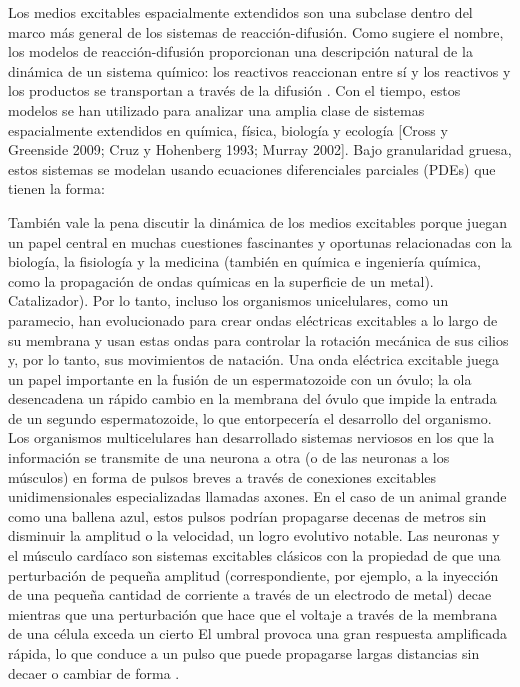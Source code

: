 Los medios excitables espacialmente extendidos son una subclase dentro del marco más general de los sistemas de reacción-difusión. Como sugiere el nombre, los modelos de reacción-difusión proporcionan una descripción natural de la dinámica de un sistema químico: los reactivos reaccionan entre sí y los reactivos y los productos se transportan a través de la difusión \cite{sinha_patterns_2019}. Con el tiempo, estos modelos se han utilizado para analizar una amplia clase de sistemas espacialmente extendidos en química, física, biología y ecología [Cross y Greenside 2009; Cruz y Hohenberg 1993; Murray 2002]. Bajo granularidad gruesa, estos sistemas se modelan usando ecuaciones diferenciales parciales (PDEs) que tienen la forma:


También vale la pena discutir la dinámica de los medios excitables porque juegan un papel central en muchas cuestiones fascinantes y oportunas relacionadas con la biología, la fisiología y la medicina (también en química e ingeniería química, como la propagación de ondas químicas en la superficie de un metal). Catalizador). Por lo tanto, incluso los organismos unicelulares, como un paramecio, han evolucionado para crear ondas eléctricas excitables a lo largo de su membrana y usan estas ondas para controlar la rotación mecánica de sus cilios y, por lo tanto, sus movimientos de natación. Una onda eléctrica excitable juega un papel importante en la fusión de un espermatozoide con un óvulo; la ola desencadena un rápido cambio en la membrana del óvulo que impide la entrada de un segundo espermatozoide, lo que entorpecería el desarrollo del organismo. Los organismos multicelulares han desarrollado sistemas nerviosos en los que la información se transmite de una neurona a otra (o de las neuronas a los músculos) en forma de pulsos breves a través de conexiones excitables unidimensionales especializadas llamadas axones. En el caso de un animal grande como una ballena azul, estos pulsos podrían propagarse decenas de metros sin disminuir la amplitud o la velocidad, un logro evolutivo notable.
Las neuronas y el músculo cardíaco son sistemas excitables clásicos con la propiedad de que una perturbación de pequeña amplitud (correspondiente, por ejemplo, a la inyección de una pequeña cantidad de corriente a través de un electrodo de metal) decae mientras que una perturbación que hace que el voltaje a través de la membrana de una célula exceda un cierto El umbral provoca una gran respuesta amplificada rápida, lo que conduce a un pulso que puede propagarse largas distancias sin decaer o cambiar de forma \cite{cross_pattern_2009}. 

